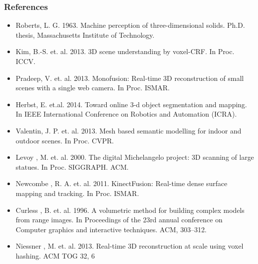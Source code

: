 \documentclass[mathserif, 8pt]{beamer}
\begin{document}
\begin{frame}
\frametitle{References}
\fontsize{6pt}{7.2}\selectfont
\begin{itemize}
  \item Roberts, L. G. 1963. Machine perception of three-dimensional solids. Ph.D. thesis, Massachusetts Institute of Technology.

  \item Kim, B.-S. et. al. 2013. 3D scene understanding by voxel-CRF. In Proc. ICCV.

  \item Pradeep, V. et. al. 2013. Monofusion: Real-time 3D reconstruction of small scenes with a single web camera. In Proc. ISMAR.

  \item Herbst, E. et.al. 2014. Toward online 3-d object segmentation and mapping. In IEEE International Conference on Robotics and Automation (ICRA).

  \item Valentin, J. P. et. al. 2013. Mesh based semantic modelling for indoor and outdoor scenes. In Proc. CVPR.

  \item Levoy , M. et. al. 2000. The digital Michelangelo project: 3D scanning of large statues. In Proc. SIGGRAPH. ACM.

  \item Newcombe , R. A. et. al. 2011. KinectFusion: Real-time dense surface mapping and tracking. In Proc. ISMAR.  
  
  \item Curless , B. et. al. 1996. A volumetric method for building complex models from range images. In Proceedings of the 23rd annual conference on Computer graphics and interactive techniques. ACM, 303–312.
  
  \item Niessner , M. et. al. 2013. Real-time 3D reconstruction at scale using voxel hashing. ACM TOG 32, 6
\end{itemize}
\end{frame}
\end{document}
